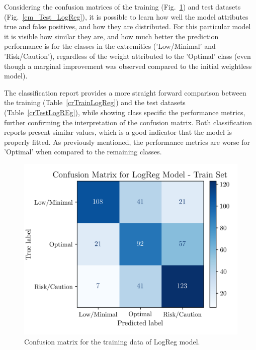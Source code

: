 \documentclass[conference]{IEEEtran}
\begin{document}
Considering the confusion matrices of the training (Fig.~\ref{cf_train_LogReg}) and test datasets (Fig.~\ref{cm_Test_LogReg}), it is possible to learn how well the model attributes true and false positives, and how they are distributed. For this particular model it is visible how similar they are, and how much better the prediction performance is for the classes in the extremities ('Low/Minimal' and 'Risk/Caution'), regardless of the weight attributed to the 'Optimal' class (even though a marginal improvement was observed compared to the initial weightless model).

The classification report provides a more straight forward comparison between the training (Table~\ref{crTrainLogReg}) and the test datasets (Table~\ref{crTestLogREg}), while showing class specific the performance metrics, further confirming the interpretation of the confusion matrix. Both classification reports present similar values, which is a good indicator that the model is properly fitted. As previously mentioned, the performance metrics are worse for 'Optimal' when compared to the remaining classes.

\begin{figure}[H]
    \centering
    \includegraphics[width=1\linewidth]{assets/LOGR_confmatTrain.png}
    \caption{Confusion matrix for the training data of LogReg model.}
    \label{cf_train_LogReg}
\end{figure} %
\end{document}
